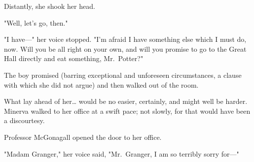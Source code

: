 Distantly, she shook her head.

"Well, let's go, then."

"I have---" her voice stopped. "I'm afraid I have something else which I must 
do, now. Will you be all right on your own, and will you promise to go to the 
Great Hall directly and eat something, Mr.~Potter?"

The boy promised (barring exceptional and unforeseen circumstances, a clause 
with which she did not argue) and then walked out of the room.

What lay ahead of her{\ldots} would be no easier, certainly, and might well be 
harder.
\sbreak
Minerva walked to her office at a swift pace; not slowly, for that would have 
been a discourtesy.

Professor McGonagall opened the door to her office.

"Madam Granger," her voice said, "Mr.~Granger, I am so terribly sorry for---"